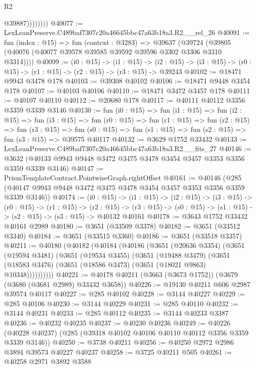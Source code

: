 \begin{lexlean}{R2}
\begin{coremodule}
                    @39887))))))))
@40077 := LexLeanPreserve.C489baf7307c20a46645bbc47a63b18a3.R2.__rel_26
@40091 := fun (index : @15) =>
  fun (context : @3283) =>
  @39637 (@39724 (@39805 (@40076 (@40077 @39578 @39585 @39592 @39596 @3302 @3306 @3310 @3314))))
@40099 := (i0 : @15) ->
  (i1 : @15) ->
  (i2 : @15) -> (i3 : @15) -> (r0 : @15) -> (r1 : @15) -> (r2 : @15) -> (r3 : @15) -> @39243
@40102 := @18471 @9943 @3478 @178
@40103 := @39308 @40102
@40106 := @18471 @9448 @3454 @178
@40107 := @40103 @40106
@40110 := @18471 @3472 @3457 @178
@40111 := @40107 @40110
@40112 := @20680 @178
@40117 := @40111 @40112 @3356 @3359 @3339 @3146
@40130 := fun (i0 : @15) =>
  fun (i1 : @15) =>
  fun (i2 : @15) =>
  fun (i3 : @15) =>
  fun (r0 : @15) =>
  fun (r1 : @15) =>
  fun (r2 : @15) =>
  fun (r3 : @15) =>
  fun (s0 : @15) => fun (s1 : @15) => fun (s2 : @15) => fun (s3 : @15) => @39575 @40117
@40132 := @3629 @1752 @33432
@40133 := LexLeanPreserve.C489baf7307c20a46645bbc47a63b18a3.R2.__fits_27
@40146 := @3632 (@40133 @9943 @9448 @3472 @3475 @3478 @3454 @3457 @3353 @3356 @3359 @3339 @3146)
@40147 := PrismTemplateContract.PointwiseGraph.rightOffset
@40161 := @40146
    (@285 (@40147 @9943 @9448 @3472 @3475 @3478 @3454 @3457 @3353 @3356 @3359 @3339 @3146))
@40174 := (i0 : @15) ->
  (i1 : @15) ->
  (i2 : @15) ->
  (i3 : @15) ->
  (r0 : @15) ->
  (r1 : @15) ->
  (r2 : @15) -> (r3 : @15) -> (s0 : @15) -> (s1 : @15) -> (s2 : @15) -> (s3 : @15) -> @40132 @40161
@40178 := @3643 @1752 @33432 @40161 @2989
@40180 := @3651 (@33509 @3378)
@40182 := @3651 (@33512 @3340)
@40184 := @3651 (@33515 @3360)
@40186 := @3651 (@33518 @3357)
@40211 := @40180
    (@40182
      (@40184
        (@40186
          (@3651
            (@20636 @3354)
            (@3651
              (@19594 @3481)
              (@3651
                (@19534 @3455)
                (@3651
                  (@19488 @3479)
                  (@3651 (@18583 @3476) (@3651 (@18586 @3473) (@3651 (@18021 @9863) @10348))))))))))
@40221 := @40178 @40211 (@3663 (@3673 @1752)) (@3679 (@3680 (@3681 @2989) @33432 @3658))
@40226 := @19130 @40211 @606 @2987 @39574 @40117
@40227 := @285 @40102
@40228 := @3144 @40227
@40229 := @285 @40106
@40230 := @3144 @40229
@40231 := @285 @40110
@40232 := @3144 @40231
@40233 := @285 @40112
@40235 := @3144 @40233 @3387
@40236 := @40232 @40235
@40237 := @40230 @40236
@40249 := @40226 (@40228 @40237) (@285 (@39318 @40102 @40106 @40110 @40112 @3356 @3359 @3339 @3146))
@40250 := @3738 @40211
@40256 := @40250 @2972 @2986 @3894 @39573 @40227 @40237
@40258 := @3725 @40211 @505
@40261 := @40258 @2971 @3892 @3588

\end{coremodule}
\end{lexlean}
